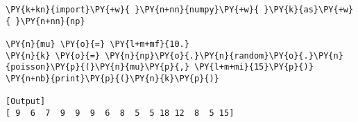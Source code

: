 \begin{Verbatim}[label=\makebox{\href{https://github.com/unipi-physics-labs/lab1-notes/tree/main/snippy/np.random.poisson.py}{https://github.com/.../np.random.poisson.py}},commandchars=\\\{\}]
\PY{k+kn}{import}\PY{+w}{ }\PY{n+nn}{numpy}\PY{+w}{ }\PY{k}{as}\PY{+w}{ }\PY{n+nn}{np}

\PY{n}{mu} \PY{o}{=} \PY{l+m+mf}{10.}
\PY{n}{k} \PY{o}{=} \PY{n}{np}\PY{o}{.}\PY{n}{random}\PY{o}{.}\PY{n}{poisson}\PY{p}{(}\PY{n}{mu}\PY{p}{,} \PY{l+m+mi}{15}\PY{p}{)}
\PY{n+nb}{print}\PY{p}{(}\PY{n}{k}\PY{p}{)}

[Output]
[ 9  6  7  9  9  9  6  8  5  5 18 12  8  5 15]
\end{Verbatim}
